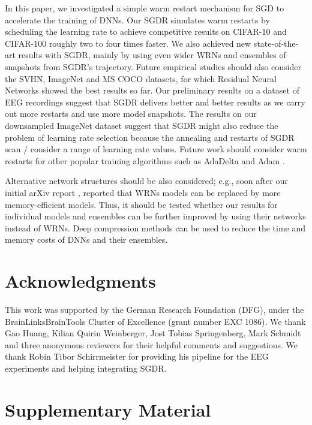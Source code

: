 \documentclass{article}
\begin{document}
In this paper, we investigated a simple warm restart mechanism for SGD to accelerate the training of DNNs. Our SGDR simulates warm restarts by scheduling the learning rate to achieve competitive results on CIFAR-10 and CIFAR-100 roughly two to four times faster. We also achieved new state-of-the-art results with SGDR, mainly by using even wider WRNs and ensembles of snapshots from SGDR's trajectory. Future empirical studies should also consider the SVHN, ImageNet and MS COCO datasets, for which Residual Neural Networks showed the best results so far. Our preliminary results on a dataset of EEG recordings suggest that SGDR delivers better and better results as we carry out more restarts and use more model snapshots. 
The results on our downsampled ImageNet dataset suggest that SGDR might also reduce the problem of learning rate selection because the annealing and restarts of SGDR scan / consider a range of learning rate values. Future work should consider warm restarts for other popular training algorithms such as AdaDelta \citep{zeiler2012adadelta} and Adam \citep{kingma2014adam}. 

Alternative network structures should be also considered; e.g., 
soon after our initial arXiv report \citep{loshchilov2016sgdr}, \cite{2016arXiv160802908Z,huang2016densely,han2016deep} reported that WRNs models can be replaced by more memory-efficient models. Thus, it should be tested whether our results for individual models and ensembles can be further improved by using their networks instead of WRNs. Deep compression methods \citep{han2015deep} can be used to reduce the time and memory costs of DNNs and their ensembles. 

\section{Acknowledgments}

This work was supported by the German Research Foundation (DFG), under the BrainLinksBrainTools
Cluster of Excellence (grant number EXC 1086).
We thank Gao Huang, Kilian Quirin Weinberger,	Jost Tobias Springenberg, Mark Schmidt and three anonymous reviewers for their helpful comments and suggestions. We thank Robin Tibor Schirrmeister for providing his pipeline for the EEG experiments and helping integrating SGDR. 




\cleardoublepage

\section{Supplementary Material}
\end{document}
